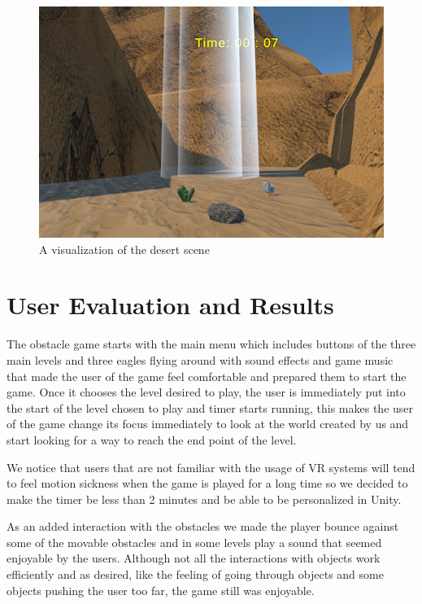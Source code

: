 \documentclass{vgtc}                          %
\begin{document}
\begin{figure}[tb]
  \centering %
  \includegraphics[width=\columnwidth]{desert2.jpg}
  \caption{A visualization of the desert scene}
 \end{figure}
\section{User Evaluation and Results}
The obstacle game starts with the main menu which includes buttons of the three main levels and three eagles flying around with sound effects and game music that made the user of the game feel comfortable and prepared them to start the game. Once it chooses the level desired to play, the user is immediately put into the start of the level chosen to play and timer starts running, this makes the user of the game  change its focus immediately to look at the world created by us and start looking for a way to reach the end point of the level.

We notice that users that are not familiar with the usage of VR systems will tend to feel motion sickness when the game is played for a long time so we decided to make the timer be less than 2 minutes and be able to be personalized in Unity.

As an added interaction with the obstacles we made the player bounce against some of the movable obstacles and in some levels play a sound that seemed enjoyable by the users. Although not all the interactions with objects work efficiently and as desired, like the feeling of going through objects and some objects pushing the user too far, the game still was enjoyable.
\end{document}
